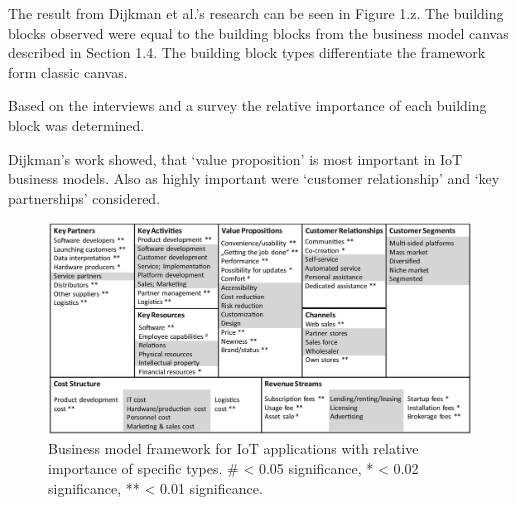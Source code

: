 		The result from Dijkman et al.'s research can be seen in Figure 1.z. The building blocks observed were equal to the building blocks from the business model canvas described in Section 1.4. The building block types differentiate the framework form classic canvas.

		Based on the interviews and a survey the relative importance of each building block was determined. 

		Dijkman's work showed, that `value proposition' is most important in IoT business models. Also as highly important were `customer relationship' and `key  partnerships' considered. 
		\begin{figure}[h]
			\begin{center}
		    \includegraphics[scale=0.52]{Talk11/iot_canvas_rel_imp_dijkman.jpg}
		    \end{center}
		    \caption{Business model framework for IoT applications with relative importance of specific types. \# < 0.05 significance, * < 0.02 significance, **  < 0.01 significance.}
		    \label{Business model for IoT}
		\end{figure}

